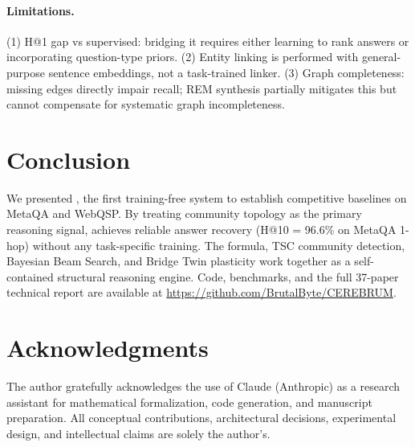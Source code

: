 \documentclass[10pt,twocolumn]{article}
\begin{document}
\paragraph{Limitations.}
(1) H@1 gap vs supervised: bridging it requires either learning to rank answers or
incorporating question-type priors. (2) Entity linking is performed with general-purpose
sentence embeddings, not a task-trained linker. (3) Graph completeness: missing edges
directly impair recall; REM synthesis partially mitigates this but cannot compensate for
systematic graph incompleteness.

\section{Conclusion}
\label{sec:conclusion}

We presented \CEREBRUM{}, the first training-free system to establish competitive
baselines on MetaQA and WebQSP. By treating community topology as the primary reasoning
signal, \CEREBRUM{} achieves reliable answer recovery (H@10 = 96.6\% on MetaQA 1-hop)
without any task-specific training. The \CSA{} formula, TSC community detection,
Bayesian Beam Search, and Bridge Twin plasticity work together as a self-contained
structural reasoning engine. Code, benchmarks, and the full 37-paper technical report
are available at \url{https://github.com/BrutalByte/CEREBRUM}.

\section*{Acknowledgments}
The author gratefully acknowledges the use of Claude (Anthropic) as a research assistant
for mathematical formalization, code generation, and manuscript preparation. All
conceptual contributions, architectural decisions, experimental design, and intellectual
claims are solely the author's.
\end{document}
